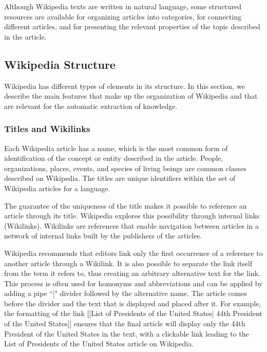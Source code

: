Although Wikipedia texts are written in natural language, some structured resources are available for organizing articles into categories, for connecting different articles, and for presenting the relevant properties of the topic described in the article.


\subsection{\hspace*{3pt}Wikipedia Structure}

Wikipedia has different types of elements in its structure. In this section, we describe the main features that make up the organization of Wikipedia and that are relevant for the automatic extraction of knowledge.

\subsubsection{\hspace*{3pt}Titles and Wikilinks}
Each Wikipedia article has a name, which is the most common form of identification of the concept or entity described in the article.  People, organizations, places, events, and species of living beings are common classes described on Wikipedia. The titles are unique identifiers within the set of Wikipedia articles for a language.

The guarantee of the uniqueness of the title makes it possible to reference an article through its title. Wikipedia explores this possibility through internal links (Wikilinks).   Wikilinks are references that enable navigation between articles in a network of internal links built by the publishers of the articles. 

Wikipedia recommends that editors link only the first occurrence of a reference to another article through a Wikilink. It is also possible to separate the link itself from the term it refers to, thus creating an arbitrary alternative text for the link. This process is often used for homonyms and abbreviations and can be applied by adding a pipe ``|" divider followed by the alternative name. The article comes before the divider and the text that is displayed and placed after it.  For example, the formatting of the link [[List of Presidents of the United States| 44th President of the United States]] ensures that the final article will display only the 44th President of the United States in the text, with a clickable link leading to the List of Presidents of the United States article on Wikipedia. 

